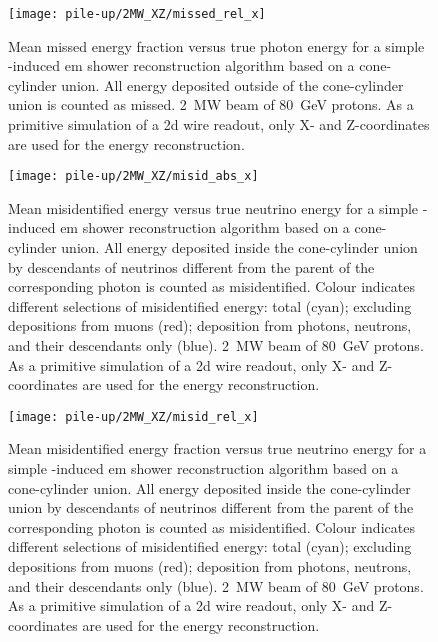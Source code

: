 \begin{figure}[htb]
	\centering
	\texttt{[image: pile-up/2MW\_XZ/missed\_rel\_x]}
	\caption[Pile-up study mean missed fractional vs.\ true photon energy, \SI{2}{\mega\watt} beam, XZ projection]{%
		Mean missed energy fraction versus true photon energy for a simple \Pgpz-induced \acrshort{em} shower reconstruction algorithm based on a cone-cylinder union.
		All energy deposited outside of the cone-cylinder union is counted as missed.
		\SI{2}{\mega\watt} beam of \SI{80}{\giga\electronvolt} protons.
		As a primitive simulation of a \acrshort{2d} wire readout, only X- and Z-coordinates are used for the energy reconstruction.
	}
	\label{fig:dune-nd_2MW-XZ_missed-rel-x}
\end{figure}

\begin{figure}[htb]
	\centering
	\texttt{[image: pile-up/2MW\_XZ/misid\_abs\_x]}
	\caption[Pile-up study mean misidentified vs.\ true neutrino energy, \SI{2}{\mega\watt} beam, XZ projection]{%
		Mean misidentified energy versus true neutrino energy for a simple \Pgpz-induced \acrshort{em} shower reconstruction algorithm based on a cone-cylinder union.
		All energy deposited inside the cone-cylinder union by descendants of neutrinos different from the parent of the corresponding \Pgpz photon is counted as misidentified.
		Colour indicates different selections of misidentified energy: total (cyan); excluding depositions from muons (red); deposition from photons, neutrons, and their descendants only (blue).
		\SI{2}{\mega\watt} beam of \SI{80}{\giga\electronvolt} protons.
		As a primitive simulation of a \acrshort{2d} wire readout, only X- and Z-coordinates are used for the energy reconstruction.
	}
	\label{fig:dune-nd_2MW-XZ_misid-abs-x}
\end{figure}

\begin{figure}[htb]
	\centering
	\texttt{[image: pile-up/2MW\_XZ/misid\_rel\_x]}
	\caption[Pile-up study mean misidentified fractional vs.\ true neutrino energy, \SI{2}{\mega\watt} beam, XZ projection]{%
		Mean misidentified energy fraction versus true neutrino energy for a simple \Pgpz-induced \acrshort{em} shower reconstruction algorithm based on a cone-cylinder union.
		All energy deposited inside the cone-cylinder union by descendants of neutrinos different from the parent of the corresponding \Pgpz photon is counted as misidentified.
		Colour indicates different selections of misidentified energy: total (cyan); excluding depositions from muons (red); deposition from photons, neutrons, and their descendants only (blue).
		\SI{2}{\mega\watt} beam of \SI{80}{\giga\electronvolt} protons.
		As a primitive simulation of a \acrshort{2d} wire readout, only X- and Z-coordinates are used for the energy reconstruction.
	}
	\label{fig:dune-nd_2MW-XZ_misid-rel-x}
\end{figure}

